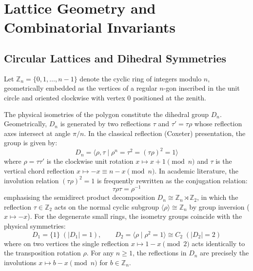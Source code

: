 \chapter{Lattice Geometry and Combinatorial Invariants}
\label{chap:lattice-architecture}

\section{Circular Lattices and Dihedral Symmetries}

Let $\mathbb{Z}_n = \{0, 1, \dots, n-1\}$ denote the cyclic ring of integers modulo $n$, geometrically embedded as the vertices of a regular $n$-gon inscribed in the unit circle and oriented clockwise with vertex $0$ positioned at the zenith. 

The physical isometries of the polygon constitute the dihedral group $D_n$. Geometrically, $D_n$ is generated by two reflections $\tau$ and $\tau' = \tau \rho$ whose reflection axes intersect at angle $\pi / n$. In the classical reflection (Coxeter) presentation, the group is given by:
\begin{equation}
D_n = \langle \rho, \tau \mid \rho^n = \tau^2 = (\tau \rho)^2 = 1 \rangle
\end{equation}
where $\rho = \tau \tau'$ is the clockwise unit rotation $x \mapsto x + 1 \pmod n$ and $\tau$ is the vertical chord reflection $x \mapsto -x \equiv n - x \pmod n$. In academic literature, the involution relation $(\tau \rho)^2 = 1$ is frequently rewritten as the conjugation relation:
\begin{equation}
\tau \rho \tau = \rho^{-1}
\end{equation}
emphasising the semidirect product decomposition $D_n \cong \mathbb{Z}_n \rtimes \mathbb{Z}_2$, in which the reflection $\tau \in \mathbb{Z}_2$ acts on the normal cyclic subgroup $\langle \rho \rangle \cong \mathbb{Z}_n$ by group inversion ($x \mapsto -x$). For the degenerate small rings, the isometry groups coincide with the physical symmetries:
\begin{equation}
D_1 = \{1\} \; (|D_1| = 1), \qquad D_2 = \langle \rho \mid \rho^2 = 1 \rangle \cong C_2 \; (|D_2| = 2)
\end{equation}
where on two vertices the single reflection $x \mapsto 1 - x \pmod 2$ acts identically to the transposition rotation $\rho$. For any $n \ge 1$, the reflections in $D_n$ are precisely the involutions $x \mapsto b - x \pmod n$ for $b \in \mathbb{Z}_n$.

